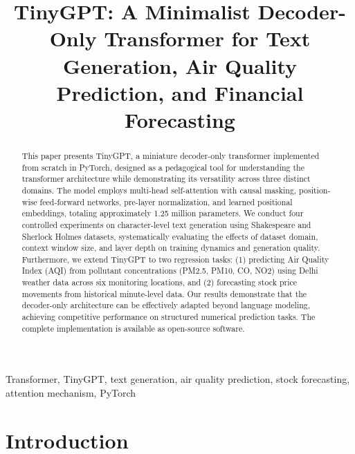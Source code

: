 \documentclass[conference]{IEEEtran}
\begin{document}
\title{TinyGPT: A Minimalist Decoder-Only Transformer for Text Generation, Air Quality Prediction, and Financial Forecasting}

\author{
}

\maketitle

\begin{abstract}
This paper presents TinyGPT, a miniature decoder-only transformer implemented from scratch in PyTorch, designed as a pedagogical tool for understanding the transformer architecture while demonstrating its versatility across three distinct domains. The model employs multi-head self-attention with causal masking, position-wise feed-forward networks, pre-layer normalization, and learned positional embeddings, totaling approximately 1.25 million parameters. We conduct four controlled experiments on character-level text generation using Shakespeare and Sherlock Holmes datasets, systematically evaluating the effects of dataset domain, context window size, and layer depth on training dynamics and generation quality. Furthermore, we extend TinyGPT to two regression tasks: (1) predicting Air Quality Index (AQI) from pollutant concentrations (PM2.5, PM10, CO, NO2) using Delhi weather data across six monitoring locations, and (2) forecasting stock price movements from historical minute-level data. Our results demonstrate that the decoder-only architecture can be effectively adapted beyond language modeling, achieving competitive performance on structured numerical prediction tasks. The complete implementation is available as open-source software.
\end{abstract}

\begin{IEEEkeywords}
Transformer, TinyGPT, text generation, air quality prediction, stock forecasting, attention mechanism, PyTorch
\end{IEEEkeywords}

\FloatBarrier
\section{Introduction}
\label{sec:introduction}
\end{document}
